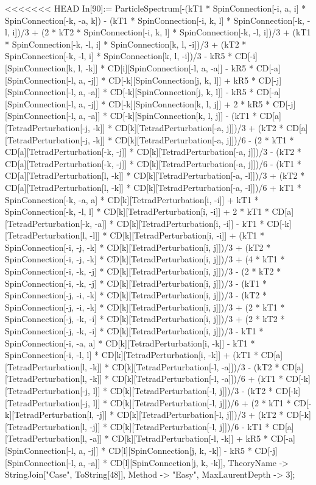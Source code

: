 <<<<<<< HEAD
In[90]:= ParticleSpectrum[-(kT1 * SpinConnection[-i, a, i] * SpinConnection[-k, -a, k]) - (kT1 * SpinConnection[-i, k, l] * SpinConnection[-k, -l, i])/3 + (2 * kT2 * SpinConnection[-i, k, l] * SpinConnection[-k, -l, i])/3 + (kT1 * SpinConnection[-k, -l, i] * SpinConnection[k, l, -i])/3 + (kT2 * SpinConnection[-k, -l, i] * SpinConnection[k, l, -i])/3 - kR5 * CD[-i][SpinConnection[k, l, -k]] * CD[i][SpinConnection[-l, a, -a]] - kR5 * CD[-a][SpinConnection[-l, a, -j]] * CD[-k][SpinConnection[j, k, l]] + kR5 * CD[-j][SpinConnection[-l, a, -a]] * CD[-k][SpinConnection[j, k, l]] - kR5 * CD[-a][SpinConnection[-l, a, -j]] * CD[-k][SpinConnection[k, l, j]] + 2 * kR5 * CD[-j][SpinConnection[-l, a, -a]] * CD[-k][SpinConnection[k, l, j]] - (kT1 * CD[a][TetradPerturbation[-j, -k]] * CD[k][TetradPerturbation[-a, j]])/3 + (kT2 * CD[a][TetradPerturbation[-j, -k]] * CD[k][TetradPerturbation[-a, j]])/6 - (2 * kT1 * CD[a][TetradPerturbation[-k, -j]] * CD[k][TetradPerturbation[-a, j]])/3 - (kT2 * CD[a][TetradPerturbation[-k, -j]] * CD[k][TetradPerturbation[-a, j]])/6 - (kT1 * CD[a][TetradPerturbation[l, -k]] * CD[k][TetradPerturbation[-a, -l]])/3 + (kT2 * CD[a][TetradPerturbation[l, -k]] * CD[k][TetradPerturbation[-a, -l]])/6 + kT1 * SpinConnection[-k, -a, a] * CD[k][TetradPerturbation[i, -i]] + kT1 * SpinConnection[-k, -l, l] * CD[k][TetradPerturbation[i, -i]] + 2 * kT1 * CD[a][TetradPerturbation[-k, -a]] * CD[k][TetradPerturbation[i, -i]] - kT1 * CD[-k][TetradPerturbation[l, -l]] * CD[k][TetradPerturbation[i, -i]] + (kT1 * SpinConnection[-i, -j, -k] * CD[k][TetradPerturbation[i, j]])/3 + (kT2 * SpinConnection[-i, -j, -k] * CD[k][TetradPerturbation[i, j]])/3 + (4 * kT1 * SpinConnection[-i, -k, -j] * CD[k][TetradPerturbation[i, j]])/3 - (2 * kT2 * SpinConnection[-i, -k, -j] * CD[k][TetradPerturbation[i, j]])/3 - (kT1 * SpinConnection[-j, -i, -k] * CD[k][TetradPerturbation[i, j]])/3 - (kT2 * SpinConnection[-j, -i, -k] * CD[k][TetradPerturbation[i, j]])/3 + (2 * kT1 * SpinConnection[-j, -k, -i] * CD[k][TetradPerturbation[i, j]])/3 + (2 * kT2 * SpinConnection[-j, -k, -i] * CD[k][TetradPerturbation[i, j]])/3 - kT1 * SpinConnection[-i, -a, a] * CD[k][TetradPerturbation[i, -k]] - kT1 * SpinConnection[-i, -l, l] * CD[k][TetradPerturbation[i, -k]] + (kT1 * CD[a][TetradPerturbation[l, -k]] * CD[k][TetradPerturbation[-l, -a]])/3 - (kT2 * CD[a][TetradPerturbation[l, -k]] * CD[k][TetradPerturbation[-l, -a]])/6 + (kT1 * CD[-k][TetradPerturbation[-j, l]] * CD[k][TetradPerturbation[-l, j]])/3 - (kT2 * CD[-k][TetradPerturbation[-j, l]] * CD[k][TetradPerturbation[-l, j]])/6 + (2 * kT1 * CD[-k][TetradPerturbation[l, -j]] * CD[k][TetradPerturbation[-l, j]])/3 + (kT2 * CD[-k][TetradPerturbation[l, -j]] * CD[k][TetradPerturbation[-l, j]])/6 - kT1 * CD[a][TetradPerturbation[l, -a]] * CD[k][TetradPerturbation[-l, -k]] + kR5 * CD[-a][SpinConnection[-l, a, -j]] * CD[l][SpinConnection[j, k, -k]] - kR5 * CD[-j][SpinConnection[-l, a, -a]] * CD[l][SpinConnection[j, k, -k]], TheoryName -> StringJoin["Case", ToString[48]], Method -> "Easy", MaxLaurentDepth -> 3]; 
